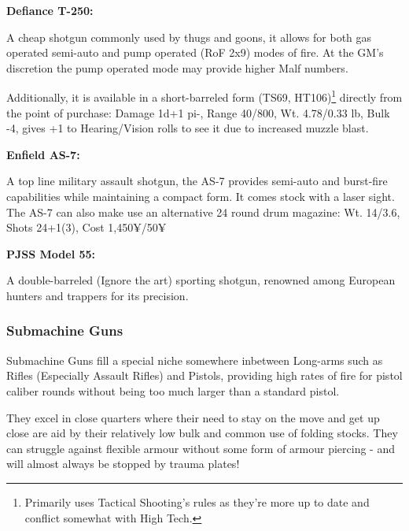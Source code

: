 \begin{mdframed}[linewidth=0pt]
\begin{multicols}{2}
	
	\textbf{Defiance T-250:}
	
	A cheap shotgun commonly used by thugs and goons, it allows for both gas operated semi-auto and pump operated (RoF 2x9) modes of fire. At the GM's discretion the pump operated mode may provide higher Malf numbers.
	
	Additionally, it is available in a short-barreled form (TS69, HT106)\footnote{Primarily uses Tactical Shooting's rules as they're more up to date and conflict somewhat with High Tech.} directly from the point of purchase: Damage 1d+1 pi-, Range 40/800, Wt. 4.78/0.33 lb, Bulk -4, gives +1 to Hearing/Vision rolls to see it due to increased muzzle blast.
	
	\textbf{Enfield AS-7:}
	
	A top line military assault shotgun, the AS-7 provides semi-auto and burst-fire capabilities while maintaining a compact form. It comes stock with a laser sight.
	The AS-7 can also make use an alternative 24 round drum magazine: Wt. 14/3.6, Shots 24+1(3), Cost 1,450¥/50¥
	
	\textbf{PJSS Model 55:}
	
	A double-barreled (Ignore the art) sporting shotgun, renowned among European hunters and trappers for its precision.

\end{multicols}
\end{mdframed}

\subsubsection{Submachine Guns}

Submachine Guns fill a special niche somewhere inbetween Long-arms such as Rifles (Especially Assault Rifles) and Pistols, providing high rates of fire for pistol caliber rounds without being too much larger than a standard pistol. 

They excel in close quarters where their need to stay on the move and get up close are aid by their relatively low bulk and common use of folding stocks. They can struggle against flexible armour without some form of armour piercing - and will almost always be stopped by trauma plates!

